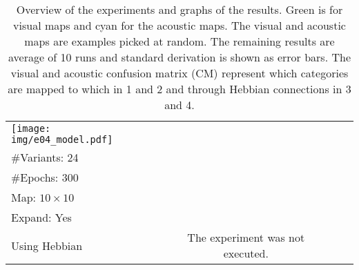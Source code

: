 \documentclass[twocolumn]{article}
\begin{document}
\begin{landscape}
\begin{table}
\begin{tabular}{lccccccccc}
\begin{minipage}{1.7cm}
                \texttt{[image: img/e04\_model.pdf]}
            \end{minipage}
            & \begin{minipage}{2cm}
                \scriptsize
                \#Categories: 100 \\
                \#Variants: 24 \\
                \#Epochs: 300 \\
                Map: $10 \times 10$ \\
                Expand: Yes \\
                Using Hebbian
            \end{minipage}
            & \multicolumn{7}{c}{The experiment was not executed.}
            \\
        \hline
        \end{tabular}
        \caption{Overview of the experiments and graphs of the results. Green is for visual maps and cyan for the acoustic maps. The visual and acoustic maps are examples picked at random. The remaining results are average of 10 runs and standard derivation is shown as error bars. The visual and acoustic confusion matrix (CM) represent which categories are mapped to which in 1 and 2 and through Hebbian connections in 3 and 4.}
        \label{tab:experiments}
    \end{table}


\end{landscape}
\end{document}
